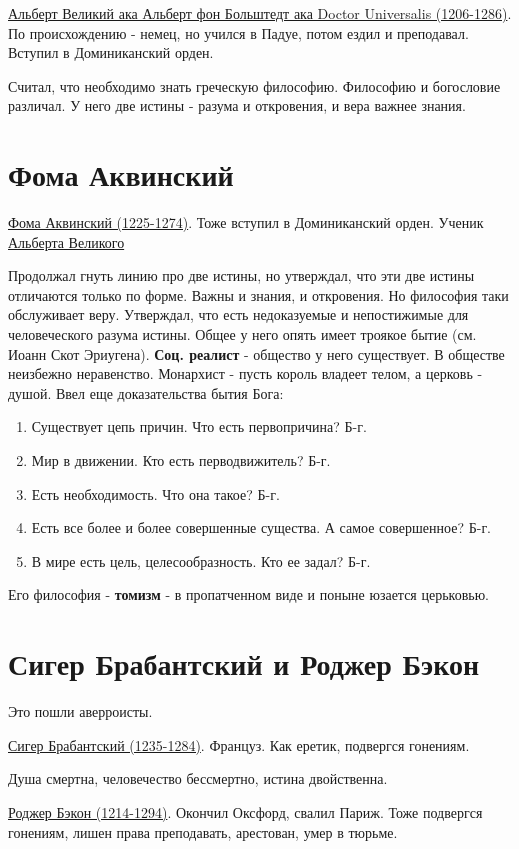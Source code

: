 \documentclass[12pt,a4paper]{article}
\begin{document}
\underline{Альберт Великий  ака Альберт фон Больштедт ака Doctor Universalis (1206-1286)}. По происхождению - немец, но учился в Падуе, потом ездил и преподавал. Вступил в Доминиканский орден.

Считал, что необходимо знать греческую философию. Философию и богословие различал. У него две истины - разума и откровения, и вера важнее знания.

\section{Фома Аквинский}
\hspace{8pt} 
\underline{Фома Аквинский (1225-1274)}. Тоже вступил в Доминиканский орден. Ученик \underline{Альберта Великого} 

Продолжал гнуть линию про две истины, но утверждал, что эти две истины отличаются только по форме. Важны и знания, и откровения. Но философия таки обслуживает веру. Утверждал, что есть недоказуемые и непостижимые для человеческого разума истины. Общее у него опять имеет троякое бытие (см. Иоанн Скот Эриугена). \textbf{Соц. реалист} - общество у него существует. В обществе неизбежно неравенство. Монархист - пусть король владеет телом, а церковь - душой. Ввел еще доказательства бытия Бога:
\begin{enumerate}
\item Существует цепь причин. Что есть первопричина? Б-г.
\item Мир в движении. Кто есть перводвижитель? Б-г.
\item Есть необходимость. Что она такое? Б-г.
\item Есть все более и более совершенные существа. А самое совершенное? Б-г.
\item В мире есть цель, целесообразность. Кто ее задал? Б-г.
\end{enumerate}
Его философия - \textbf{томизм} - в пропатченном виде и поныне юзается церьковью.

\section{Сигер Брабантский и Роджер Бэкон}
Это пошли аверроисты.

\underline{Сигер Брабантский (1235-1284)}. Француз. Как еретик, подвергся гонениям.

Душа смертна, человечество бессмертно, истина двойственна.
 
\underline{Роджер Бэкон (1214-1294)}. Окончил Оксфорд, свалил  Париж. Тоже подвергся гонениям, лишен права преподавать, арестован, умер в тюрьме.
\end{document}
